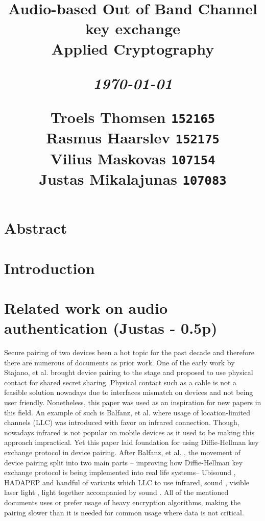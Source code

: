 \documentclass[12pt]{article}
\title{
  \vspace{4cm}
  \begin{flushleft}
  \Large{\textbf{Audio-based Out of Band Channel key exchange}} \\
  \large{Applied Cryptography}
  \end{flushleft}
  \vspace{0cm}
  \begin{flushleft}
  \small
  \textit{\today}
  \end{flushleft}
  \vspace{12cm}
  \begin{flushleft}
  \small
  Troels Thomsen \texttt{152165} \\
  Rasmus Haarslev \texttt{152175} \\
  Vilius Maskovas \texttt{107154} \\
  Justas Mikalajunas \texttt{107083}\\
  \end{flushleft}
}
\date{
}
\begin{document}
\clearpage
{}
\thispagestyle{empty}
\maketitle

\newpage

\tableofcontents

\newpage


\section{Abstract}
\label{sec:Abstract}

\newpage

\section{Introduction}
\label{sec:Introduction}

\newpage

\section{Related work on audio authentication (Justas - 0.5p)}
\label{sec:Related work on audio authentication}
Secure pairing of two devices been a hot topic for the past decade and therefore there are numerous of documents as prior work. One of the early work by  Stajano, et al. \cite {pairingintro} brought device pairing to the stage and proposed to use physical contact for shared secret sharing. Physical contact such as a cable is not a feasible solution nowadays due to interfaces mismatch on devices and not being user friendly. Nonetheless, this paper was used as an inspiration for new papers in this field. An example of such is Balfanz, et al. \cite {talkingto} where usage of location-limited channels (LLC) was introduced with favor on infrared connection. Though, nowadays infrared is not popular on mobile devices as it used to be making this approach impractical. Yet this paper laid foundation for using Diffie-Hellman key exchange protocol in device pairing. After Balfanz, et al. \cite {talkingto} , the movement of device pairing split into two main parts – improving how Diffie-Hellman key exchange protocol is being implemented into real life systems– Ubisound \cite {ubisound}, HADAPEP \cite {hadapep} and handful of variants which LLC to use infrared, sound \cite {talkingto}, visible laser light \cite {laserlight}, light together accompanied by sound \cite {beeplight}.
All of the mentioned documents uses or prefer usage of heavy encryption algorithms, making the pairing slower than it is needed for common usage where data is not critical.
\end{document}
